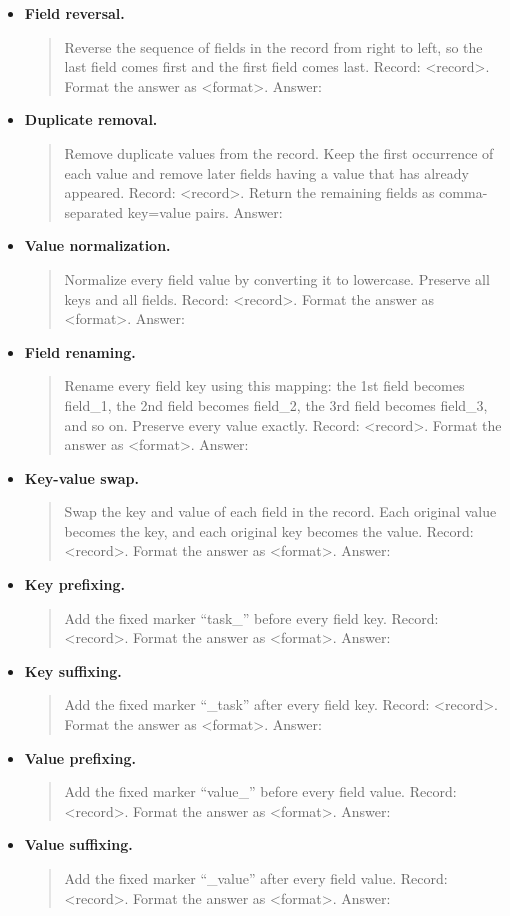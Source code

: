 \documentclass[10pt,twocolumn]{article}
\begin{document}
\begin{itemize}
    \item \textbf{Field reversal.} \begin{quote}\small\ttfamily Reverse the sequence of fields in the record from right to left, so the last field comes first and the first field comes last. Record: <record>. Format the answer as <format>. Answer:\end{quote}
    \item \textbf{Duplicate removal.} \begin{quote}\small\ttfamily Remove duplicate values from the record. Keep the first occurrence of each value and remove later fields having a value that has already appeared. Record: <record>. Return the remaining fields as comma-separated key=value pairs. Answer:\end{quote}
    \item \textbf{Value normalization.} \begin{quote}\small\ttfamily Normalize every field value by converting it to lowercase. Preserve all keys and all fields. Record: <record>. Format the answer as <format>. Answer:\end{quote}
    \item \textbf{Field renaming.} \begin{quote}\small\ttfamily Rename every field key using this mapping: the 1st field becomes field\_1, the 2nd field becomes field\_2, the 3rd field becomes field\_3, and so on. Preserve every value exactly. Record: <record>. Format the answer as <format>. Answer:\end{quote}
    \item \textbf{Key-value swap.} \begin{quote}\small\ttfamily Swap the key and value of each field in the record. Each original value becomes the key, and each original key becomes the value. Record: <record>. Format the answer as <format>. Answer:\end{quote}
    \item \textbf{Key prefixing.} \begin{quote}\small\ttfamily Add the fixed marker ``task\_'' before every field key. Record: <record>. Format the answer as <format>. Answer:\end{quote}
    \item \textbf{Key suffixing.} \begin{quote}\small\ttfamily Add the fixed marker ``\_task'' after every field key. Record: <record>. Format the answer as <format>. Answer:\end{quote}
    \item \textbf{Value prefixing.} \begin{quote}\small\ttfamily Add the fixed marker ``value\_'' before every field value. Record: <record>. Format the answer as <format>. Answer:\end{quote}
    \item \textbf{Value suffixing.} \begin{quote}\small\ttfamily Add the fixed marker ``\_value'' after every field value. Record: <record>. Format the answer as <format>. Answer:\end{quote}
\end{itemize}
\end{document}
